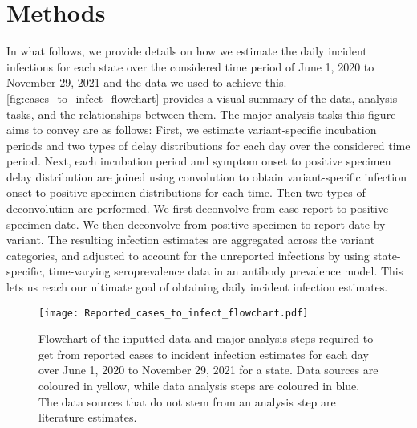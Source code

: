 \section{Methods}
\label{sec:methods}


In what follows, we provide details on how we estimate the daily incident
infections for each state over the considered time period of June 1, 2020 to
November 29, 2021 and the data we used to achieve this. 
\autoref{fig:cases_to_infect_flowchart} provides a visual summary of the data,
analysis tasks, and the relationships between them. The major analysis tasks
this figure aims to convey are as follows: First, we estimate variant-specific
incubation periods and two types of delay distributions for each day over the
considered time period. Next, each incubation period and symptom onset to
positive specimen delay distribution are joined using convolution to obtain
variant-specific infection onset to positive specimen distributions for each
time. Then two types of deconvolution are performed. We first deconvolve from
case report to positive specimen date. We then deconvolve from positive specimen
to report date by variant. The resulting infection estimates are aggregated
across the variant categories, and adjusted to account for the unreported
infections by using state-specific, time-varying seroprevalence data in an
antibody prevalence model. This lets us reach our ultimate goal of obtaining
daily incident infection estimates.


\begin{figure}[!tb]
\centering
    \texttt{[image: Reported\_cases\_to\_infect\_flowchart.pdf]} 
    \caption{Flowchart of the inputted data and major analysis steps required 
    to get from reported cases to incident infection estimates for each day 
    over June 1, 2020 to November 29, 2021 for a state. Data sources are coloured 
    in yellow, while data analysis steps are coloured in blue. The data sources that
    do not stem from an analysis step are literature estimates.}
    \label{fig:cases_to_infect_flowchart}
\end{figure}


